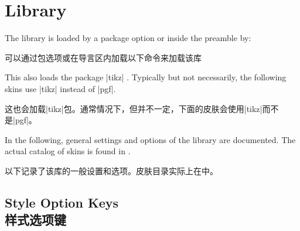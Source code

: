 \section{Library }\label{sec:skins}%
%
The library is loaded by a package option or inside the preamble by:

可以通过包选项或在导言区内加载以下命令来加载该库
\begin{dispListing}
\end{dispListing}
This also loads the package |tikz| \cite{tantau:tikz_and_pgf}. Typically but not necessarily,
the following skins use |tikz| instead of |pgf|.

这也会加载|tikz|包\cite{tantau:tikz_and_pgf}。通常情况下，但并不一定，下面的皮肤会使用|tikz|而不是|pgf|。

In the following, general settings and options of the library are
documented.
The actual catalog of skins is found in .

以下记录了该库的一般设置和选项。皮肤目录实际上在中。

\subsection{Style Option Keys\\样式选项键}\label{subsec:addstyleoptions}
% 






